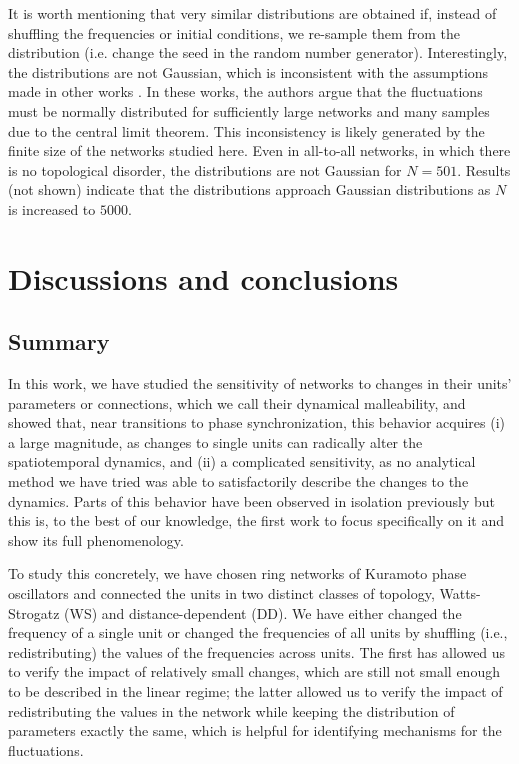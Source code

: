 It is worth mentioning that very similar distributions are obtained if, instead of shuffling the frequencies or initial conditions, we re-sample them from the distribution (i.e. change the seed in the random number generator).
Interestingly, the distributions are not Gaussian, which is inconsistent with the assumptions made in other works \cite{hong2007entrainment, hong2013link}. In these works, the authors argue that the fluctuations must be normally distributed for sufficiently large networks and many samples due to the central limit theorem. This inconsistency is likely generated by the finite size of the networks studied here. Even in all-to-all networks, in which there is no topological disorder, the distributions are not Gaussian for $N=501$. Results (not shown) indicate that the distributions approach Gaussian distributions as $N$ is increased to $5000$. 

\section{Discussions and conclusions}\label{sec:discussion_conclusion}
\subsection*{Summary}
In this work, we have studied the sensitivity of networks to changes in their units' parameters or connections, which we call their dynamical malleability, and showed that, near transitions to phase synchronization, this behavior acquires (i) a large magnitude, as changes to single units can radically alter the spatiotemporal dynamics, and (ii) a complicated sensitivity, as no analytical method we have tried was able to satisfactorily describe the changes to the dynamics. Parts of this behavior have been observed in isolation previously \cite{budzinski2020synchronization, taylor2016synchronization, hong2002synchronization, peter2018transition, fernandez2022emergence, budzinski2019synchronous} but this is, to the best of our knowledge, the first work to focus specifically on it and show its full phenomenology. 

To study this concretely, we have chosen ring networks of Kuramoto phase oscillators and connected the units in two distinct classes of topology, Watts-Strogatz (WS) and distance-dependent (DD). We have either changed the frequency of a single unit or changed the frequencies of all units by shuffling (i.e., redistributing) the values of the frequencies across units. The first has allowed us to verify the impact of relatively small changes, which are still not small enough to be described in the linear regime; the latter allowed us to verify the impact of redistributing the values in the network while keeping the distribution of parameters exactly the same, which is helpful for identifying mechanisms for the fluctuations. 

